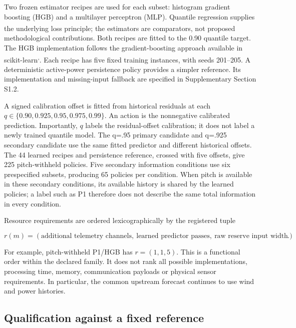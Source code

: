 \documentclass[
  british,
  11pt,
]{article}
\begin{document}
Two frozen estimator recipes are used for each subset: histogram
gradient boosting (HGB) and a multilayer perceptron (MLP). Quantile
regression supplies the underlying loss
principle\textsuperscript{}; the
estimators are comparators, not proposed methodological contributions.
Both recipes are fitted to the 0.90 quantile target. The HGB
implementation follows the gradient-boosting approach available in
scikit-learn\textsuperscript{,}.
Each recipe has five fixed training instances, with seeds 201--205. A
deterministic active-power persistence policy provides a simpler
reference. Its implementation and missing-input fallback are specified
in Supplementary Section S1.2.

A signed calibration offset is fitted from historical residuals at each
\(q\in\{0.90,0.925,0.95,0.975,0.99\}\). An action is the nonnegative
calibrated prediction. Importantly, \(q\) labels the residual-offset
calibration; it does not label a newly trained quantile model. The q=.95
primary candidate and q=.925 secondary candidate use the same fitted
predictor and different historical offsets. The 44 learned recipes and
persistence reference, crossed with five offsets, give 225
pitch-withheld policies. Five secondary information conditions use six
prespecified subsets, producing 65 policies per condition. When pitch is
available in these secondary conditions, its available history is shared
by the learned policies; a label such as P1 therefore does not describe
the same total information in every condition.

Resource requirements are ordered lexicographically by the registered
tuple

\[
r(m)=(\text{additional telemetry channels},\ 
\text{learned predictor passes},\ 
\text{raw reserve input width}).
\]

For example, pitch-withheld P1/HGB has \(r=(1,1,5)\). This is a
functional order within the declared family. It does not rank all
possible implementations, processing time, memory, communication
payloads or physical sensor requirements. In particular, the common
upstream forecast continues to use wind and power histories.

\subsection{Qualification against a fixed
reference}\label{qualification-against-a-fixed-reference}
\end{document}
